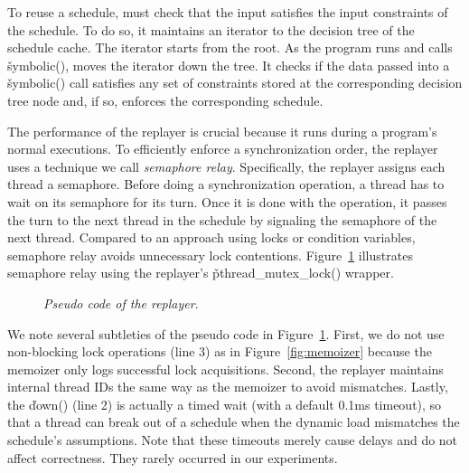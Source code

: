 To reuse a schedule, \tern must check that the input satisfies the input
constraints of the schedule.  To do so, it maintains an iterator to the
decision tree of the schedule cache.  The iterator starts from the root.
As the program runs and calls \v{symbolic()}, \tern moves the iterator down
the tree.  It checks if the data passed into a \v{symbolic()} call
satisfies any set of constraints stored at the corresponding decision tree
node and, if so, enforces the corresponding schedule.
 
The performance of the replayer is crucial because it runs during a
program's normal executions.  To efficiently enforce a synchronization
order, the replayer uses a technique we call \emph{semaphore relay}.
Specifically, the replayer assigns each thread a semaphore.  Before doing
a synchronization operation, a thread has to wait on its semaphore for its
turn.  Once it is done with the operation, it passes the turn to the next
thread in the schedule by signaling the semaphore of the next thread.
Compared to an approach using locks or condition variables, semaphore
relay avoids unnecessary lock contentions.  Figure~\ref{fig:replayer}
illustrates semaphore relay using the replayer's
\v{pthread\_mutex\_lock()} wrapper.

\begin{figure}[t]
\begin{minipage}[c]{.8\linewidth}
\tiny {}
\end{minipage}
\caption{\small \emph{Pseudo code of the replayer}.}
\label{fig:replayer}
\vspace{-.2in}
\end{figure}

We note several subtleties of the pseudo code in
Figure~\ref{fig:replayer}.  First, we do not use non-blocking lock
operations (line 3) as in Figure~\ref{fig:memoizer} because the memoizer only logs successful lock
acquisitions.  Second, the replayer maintains internal thread IDs the same
way as the memoizer to avoid mismatches.  Lastly, the \v{down()} (line 2)
is actually a timed wait (with a default 0.1ms timeout), so that a
thread can break out of a schedule when the dynamic load mismatches the
schedule's assumptions.  Note that these timeouts merely cause delays and
do not affect correctness.  They rarely occurred in our experiments.







